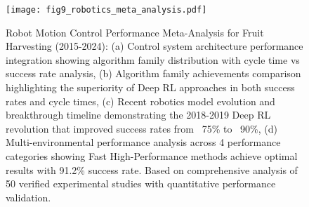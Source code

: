 \documentclass{ieeeaccess}
\begin{document}
\begin{figure}[htbp]
\centering
\texttt{[image: fig9\_robotics\_meta\_analysis.pdf]}
\caption{Robot Motion Control Performance Meta-Analysis for Fruit Harvesting (2015-2024): (a) Control system architecture performance integration showing algorithm family distribution with cycle time vs success rate analysis, (b) Algorithm family achievements comparison highlighting the superiority of Deep RL approaches in both success rates and cycle times, (c) Recent robotics model evolution and breakthrough timeline demonstrating the 2018-2019 Deep RL revolution that improved success rates from ~75\% to ~90\%, (d) Multi-environmental performance analysis across 4 performance categories showing Fast High-Performance methods achieve optimal results with 91.2\% success rate. Based on comprehensive analysis of 50 verified experimental studies with quantitative performance validation.}
\label{fig:motion_planning_analysis}
\end{figure}
\end{document}
